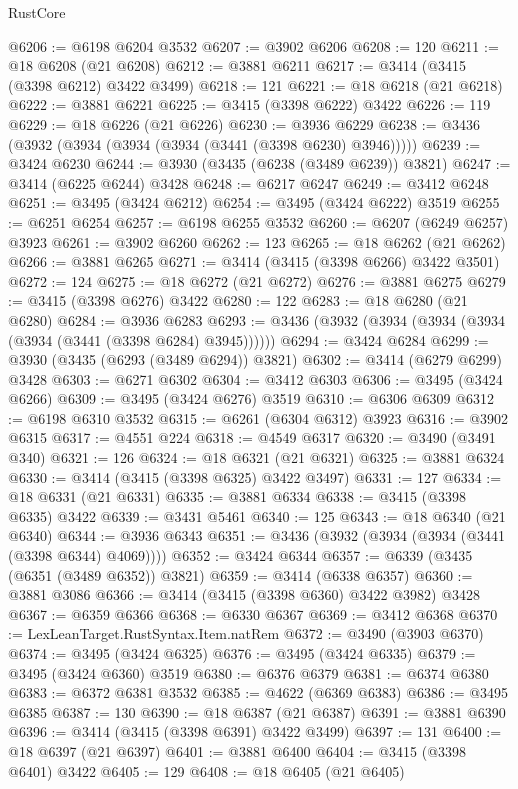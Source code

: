 \begin{lexlean}{RustCore}
\begin{coremodule}
@6206 := @6198 @6204 @3532
@6207 := @3902 @6206
@6208 := 120
@6211 := @18 @6208 (@21 @6208)
@6212 := @3881 @6211
@6217 := @3414 (@3415 (@3398 @6212) @3422 @3499)
@6218 := 121
@6221 := @18 @6218 (@21 @6218)
@6222 := @3881 @6221
@6225 := @3415 (@3398 @6222) @3422
@6226 := 119
@6229 := @18 @6226 (@21 @6226)
@6230 := @3936 @6229
@6238 := @3436 (@3932 (@3934 (@3934 (@3934 (@3441 (@3398 @6230) @3946)))))
@6239 := @3424 @6230
@6244 := @3930 (@3435 (@6238 (@3489 @6239)) @3821)
@6247 := @3414 (@6225 @6244) @3428
@6248 := @6217 @6247
@6249 := @3412 @6248
@6251 := @3495 (@3424 @6212)
@6254 := @3495 (@3424 @6222) @3519
@6255 := @6251 @6254
@6257 := @6198 @6255 @3532
@6260 := @6207 (@6249 @6257) @3923
@6261 := @3902 @6260
@6262 := 123
@6265 := @18 @6262 (@21 @6262)
@6266 := @3881 @6265
@6271 := @3414 (@3415 (@3398 @6266) @3422 @3501)
@6272 := 124
@6275 := @18 @6272 (@21 @6272)
@6276 := @3881 @6275
@6279 := @3415 (@3398 @6276) @3422
@6280 := 122
@6283 := @18 @6280 (@21 @6280)
@6284 := @3936 @6283
@6293 := @3436 (@3932 (@3934 (@3934 (@3934 (@3934 (@3441 (@3398 @6284) @3945))))))
@6294 := @3424 @6284
@6299 := @3930 (@3435 (@6293 (@3489 @6294)) @3821)
@6302 := @3414 (@6279 @6299) @3428
@6303 := @6271 @6302
@6304 := @3412 @6303
@6306 := @3495 (@3424 @6266)
@6309 := @3495 (@3424 @6276) @3519
@6310 := @6306 @6309
@6312 := @6198 @6310 @3532
@6315 := @6261 (@6304 @6312) @3923
@6316 := @3902 @6315
@6317 := @4551 @224
@6318 := @4549 @6317
@6320 := @3490 (@3491 @340)
@6321 := 126
@6324 := @18 @6321 (@21 @6321)
@6325 := @3881 @6324
@6330 := @3414 (@3415 (@3398 @6325) @3422 @3497)
@6331 := 127
@6334 := @18 @6331 (@21 @6331)
@6335 := @3881 @6334
@6338 := @3415 (@3398 @6335) @3422
@6339 := @3431 @5461
@6340 := 125
@6343 := @18 @6340 (@21 @6340)
@6344 := @3936 @6343
@6351 := @3436 (@3932 (@3934 (@3934 (@3441 (@3398 @6344) @4069))))
@6352 := @3424 @6344
@6357 := @6339 (@3435 (@6351 (@3489 @6352)) @3821)
@6359 := @3414 (@6338 @6357)
@6360 := @3881 @3086
@6366 := @3414 (@3415 (@3398 @6360) @3422 @3982) @3428
@6367 := @6359 @6366
@6368 := @6330 @6367
@6369 := @3412 @6368
@6370 := LexLeanTarget.RustSyntax.Item.natRem
@6372 := @3490 (@3903 @6370)
@6374 := @3495 (@3424 @6325)
@6376 := @3495 (@3424 @6335)
@6379 := @3495 (@3424 @6360) @3519
@6380 := @6376 @6379
@6381 := @6374 @6380
@6383 := @6372 @6381 @3532
@6385 := @4622 (@6369 @6383)
@6386 := @3495 @6385
@6387 := 130
@6390 := @18 @6387 (@21 @6387)
@6391 := @3881 @6390
@6396 := @3414 (@3415 (@3398 @6391) @3422 @3499)
@6397 := 131
@6400 := @18 @6397 (@21 @6397)
@6401 := @3881 @6400
@6404 := @3415 (@3398 @6401) @3422
@6405 := 129
@6408 := @18 @6405 (@21 @6405)

\end{coremodule}
\end{lexlean}
